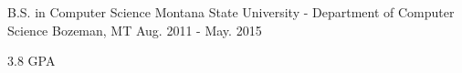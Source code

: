 

\begin{cventries}

  \cventry
    {B.S. in Computer Science} %
    {Montana State University - Department of Computer Science} %
    {Bozeman, MT} %
    {Aug. 2011 - May. 2015} %
    {
      \begin{cvitems} %
        \item {3.8 GPA}
      \end{cvitems}
    }

\end{cventries}
